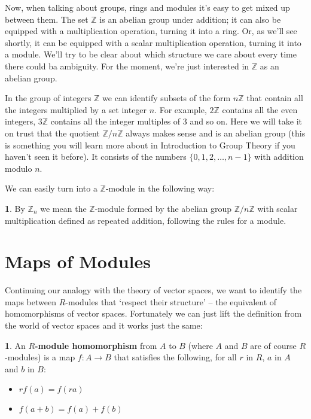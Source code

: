 \documentclass[oneside,english]{amsbook}
\numberwithin{section}{chapter}
\theoremstyle{plain}
\theoremstyle{definition}
\newtheorem{defn}[thm]{\protect\definitionname}
\providecommand{\definitionname}{Definition}
\begin{document}
			Now, when talking about groups, rings and modules it's easy to get mixed up between them. The set $\mathbb{Z}$ is an abelian group under addition; it can also be equipped with a multiplication operation, turning it into a ring. Or, as we'll see shortly, it can be equipped with a scalar multiplication operation, turning it into a module. We'll try to be clear about which structure we care about every time there could ba ambiguity. For the moment, we're just interested in $\mathbb{Z}$ as an abelian group.
			
			In the group of integers $\mathbb{Z}$ we can identify subsets of the form $n\mathbb{Z}$ that contain all the integers multiplied by a set integer $n$. For example, $2\mathbb{Z}$ contains all the even integers, $3\mathbb{Z}$ contains all the integer multiples of 3 and so on. Here we will take it on trust that the quotient $\mathbb{Z}/n\mathbb{Z}$ always makes sense and is an abelian group (this is something you will learn more about in Introduction to Group Theory if you haven't seen it before). It consists of the numbers $\{0, 1, 2, \ldots, n-1\}$ with addition modulo $n$.
			
			We can easily turn into a $\mathbb{Z}$-module in the following way:
			\begin{defn}
				By $\mathbb{Z}_n$ we mean the $\mathbb{Z}$-module formed by the abelian group $\mathbb{Z}/n\mathbb{Z}$ with scalar multiplication defined as repeated addition, following the rules for a module.
			\end{defn}
			

	
		\section{Maps of Modules}
			
			Continuing our analogy with the theory of vector spaces, we want to identify the maps between $R$-modules that `respect their structure' -- the equivalent of homomorphisms of vector spaces. Fortunately we can just lift the definition from the world of vector spaces and it works just the same:
			
			\begin{defn}
				An \textbf{$R$-module homomorphism} from $A$ to $B$ (where $A$ and $B$ are of course $R$-modules) is a map $f:A\to B$ that satisfies the following, for all $r$ in $R$, $a$ in $A$ and $b$ in $B$:
				\begin{itemize}
					\item $rf(a) = f(ra)$
					\item $f(a + b) = f(a) + f(b)$
				\end{itemize}
			\end{defn}
			
\end{document}
